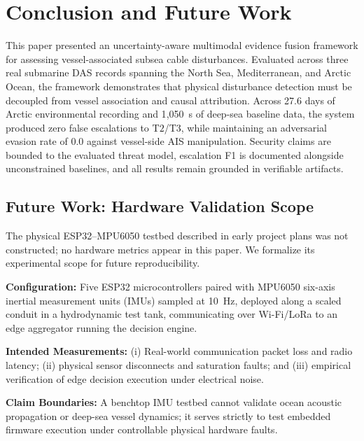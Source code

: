 \documentclass[conference]{IEEEtran}
\newcommand{\dstate}[1]{\ensuremath{\mathrm{#1}}}
\begin{document}
\section{Conclusion and Future Work}
\label{sec:conclusion}

This paper presented an uncertainty-aware multimodal evidence fusion framework for assessing vessel-associated subsea cable disturbances. Evaluated across three real submarine DAS records spanning the North Sea, Mediterranean, and Arctic Ocean, the framework demonstrates that physical disturbance detection must be decoupled from vessel association and causal attribution. Across 27.6 days of Arctic environmental recording and 1{,}050~s of deep-sea baseline data, the system produced zero false escalations to \dstate{T2}/\dstate{T3}, while maintaining an adversarial evasion rate of 0.0 against vessel-side AIS manipulation. Security claims are bounded to the evaluated threat model, escalation F1 is documented alongside unconstrained baselines, and all results remain grounded in verifiable artifacts.

\subsection{Future Work: Hardware Validation Scope}
\label{sec:hardware}

The physical ESP32--MPU6050 testbed described in early project plans was not constructed; no hardware metrics appear in this paper. We formalize its experimental scope for future reproducibility.

\textbf{Configuration:} Five ESP32 microcontrollers paired with MPU6050 six-axis inertial measurement units (IMUs) sampled at 10~Hz, deployed along a scaled conduit in a hydrodynamic test tank, communicating over Wi-Fi/LoRa to an edge aggregator running the decision engine.

\textbf{Intended Measurements:} (i) Real-world communication packet loss and radio latency; (ii) physical sensor disconnects and saturation faults; and (iii) empirical verification of edge decision execution under electrical noise.

\textbf{Claim Boundaries:} A benchtop IMU testbed cannot validate ocean acoustic propagation or deep-sea vessel dynamics; it serves strictly to test embedded firmware execution under controllable physical hardware faults.
\end{document}
